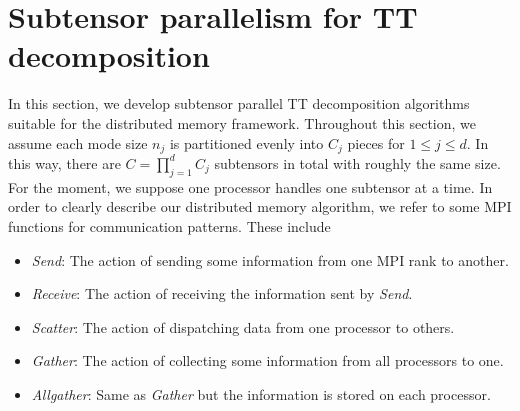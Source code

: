 \documentclass[11pt,a4paper,review]{siamart220329}
\begin{document}
\section{Subtensor parallelism for TT decomposition}
\label{sec:subTTcross}
In this section, we develop subtensor parallel TT decomposition algorithms suitable for the distributed memory framework. Throughout this section, we assume each mode size $n_j$ is partitioned evenly into $C_j$ pieces for $1 \le j \le d$. In this way, there are $C = \prod_{j=1}^d C_j$ subtensors in total with roughly the same size. For the moment, we suppose one processor handles one subtensor at a time. In order to clearly describe our distributed memory algorithm, we refer to some MPI functions for communication patterns. These include
\begin{itemize}[leftmargin=*,noitemsep]
\item \textit{Send}: The action of sending some information from one MPI rank to another.
\item \textit{Receive}: The action of receiving the information sent by \textit{Send}.
\item \textit{Scatter}: The action of dispatching data from one processor to others.
\item \textit{Gather}: The action of collecting some information from all processors to one.
\item \textit{Allgather}: Same as \textit{Gather} but the information is stored on each processor.
\end{itemize}
\end{document}
